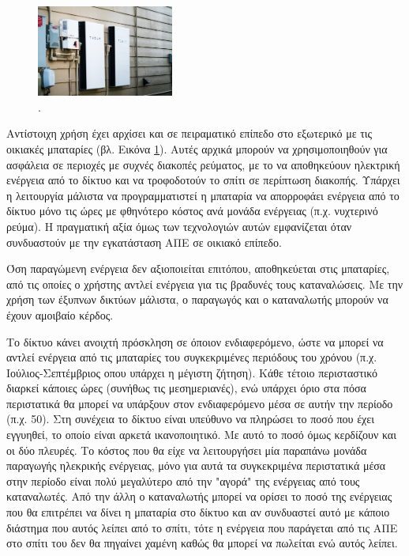\documentclass[12pt]{report}
\begin{document}
\begin{figure}
				\includegraphics[width=0.4\textwidth]{powerwall}
				\captionsetup{name=Εικόνα}
				\caption{{}.}
				\label{fig:powerwall}
\end{figure}

Αντίστοιχη χρήση έχει αρχίσει και σε πειραματικό επίπεδο στο εξωτερικό με τις οικιακές μπαταρίες (βλ. Εικόνα \ref{fig:powerwall}). Αυτές αρχικά μπορούν να χρησιμοποιηθούν για ασφάλεια σε περιοχές με συχνές διακοπές ρεύματος, με το 
να αποθηκεύουν ηλεκτρική ενέργεια από το δίκτυο και να τροφοδοτούν το σπίτι σε περίπτωση διακοπής. Υπάρχει η λειτουργία μάλιστα να προγραμματιστεί η μπαταρία να απορροφάει ενέργεια από το δίκτυο μόνο τις ώρες με φθηνότερο κόστος 
ανά μονάδα ενέργειας (π.χ. νυχτερινό ρεύμα). Η πραγματική αξία όμως των τεχνολογιών αυτών εμφανίζεται όταν συνδυαστούν με την εγκατάσταση ΑΠΕ σε οικιακό επίπεδο. 

Όση παραγώμενη ενέργεια δεν αξιοποιείται επιτόπου, αποθηκεύεται στις μπαταρίες, από τις οποίες ο χρήστης αντλεί ενέργεια για τις βραδυνές τους καταναλώσεις. Με την χρήση των έξυπνων δικτύων μάλιστα, ο παραγωγός και ο 	
καταναλωτής μπορούν να έχουν αμοιβαίο κέρδος. 

Το δίκτυο κάνει ανοιχτή πρόσκληση σε όποιον ενδιαφερόμενο, ώστε να μπορεί να αντλεί ενέργεια από τις μπαταρίες του συγκεκριμένες περιόδους του χρόνου (π.χ. Ιούλιος-Σεπτέμβριος οπου υπάρχει η μέγιστη ζήτηση). Κάθε τέτοιο περισταστικό 
διαρκεί κάποιες ώρες (συνήθως τις μεσημεριανές), ενώ υπάρχει όριο στα πόσα περιστατικά θα μπορεί να υπάρξουν στον ενδιαφερόμενο μέσα σε αυτήν την περίοδο (π.χ. 50). Στη συνέχεια το δίκτυο 
είναι υπεύθυνο να πληρώσει το ποσό που έχει εγγυηθεί, το οποίο είναι αρκετά ικανοποιητικό. Με αυτό το ποσό όμως κερδίζουν και οι δύο πλευρές. Το κόστος που θα είχε να λειτουργήσει μία παραπάνω μονάδα παραγωγής ηλεκρικής ενέργειας, 
μόνο για αυτά τα συγκεκριμένα περιστατικά μέσα στην περίοδο είναι πολύ μεγαλύτερο από την "αγορά" της ενέργειας από τους καταναλωτές. Από την άλλη ο καταναλωτής μπορεί να ορίσει το ποσό της ενέργειας που θα 
επιτρέπει να δίνει η μπαταρία στο δίκτυο και αν συνδυαστεί αυτό με κάποιο διάστημα που αυτός λείπει από το σπίτι, τότε η ενέργεια που παράγεται από τις ΑΠΕ στο σπίτι του δεν θα πηγαίνει χαμένη καθώς θα μπορεί να πωλείται ενώ αυτός 
λείπει. 
\end{document}
